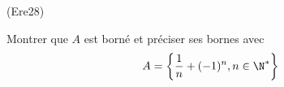 \begin{tiny}(Ere28)\end{tiny} Montrer que $A$ est borné et préciser ses bornes avec
\begin{displaymath}
  A = \left\lbrace \frac{1}{n} +(-1)^n, n\in \N^*\right\rbrace 
\end{displaymath}
